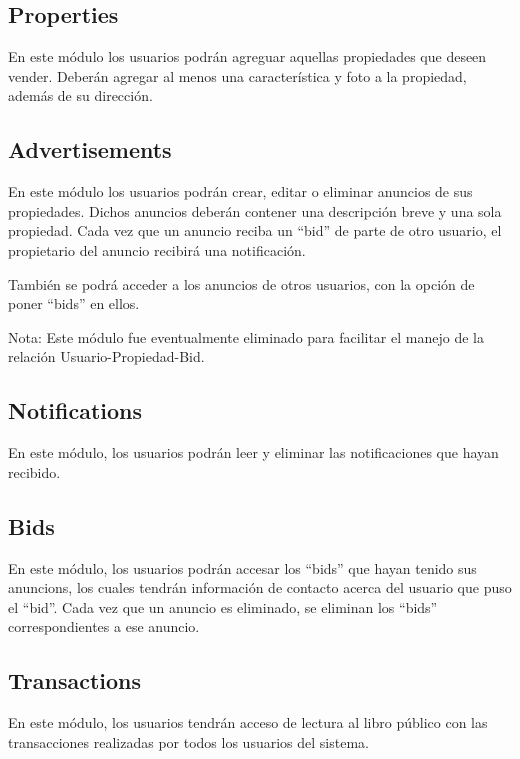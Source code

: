 \documentclass{article}
\begin{document}
\subsection{Properties}
En este m\'odulo los usuarios podr\'an agreguar aquellas propiedades que deseen vender. Deber\'an agregar al menos una caracter\'istica y foto a la propiedad, adem\'as de su direcci\'on.

\subsection{Advertisements}
En este m\'odulo los usuarios podr\'an crear, editar o eliminar anuncios de sus propiedades. Dichos anuncios deber\'an contener una descripci\'on breve y una sola propiedad. Cada vez que un anuncio reciba un ``bid'' de parte de otro usuario, el propietario del anuncio recibir\'a una notificaci\'on.

Tambi\'en se podr\'a acceder a los anuncios de otros usuarios, con la opci\'on de poner ``bids'' en ellos.

Nota: Este m\'odulo fue eventualmente eliminado para facilitar el manejo de la relaci\'on Usuario-Propiedad-Bid.

\subsection{Notifications}
En este m\'odulo, los usuarios podr\'an leer y eliminar las notificaciones que hayan recibido.

\subsection{Bids}
En este m\'odulo, los usuarios podr\'an accesar los ``bids'' que hayan tenido sus anuncions, los cuales tendr\'an informaci\'on de contacto acerca del usuario que puso el ``bid''. Cada vez que un anuncio es eliminado, se eliminan los ``bids'' correspondientes a ese anuncio.

\subsection{Transactions}
En este m\'odulo, los usuarios tendr\'an acceso de lectura al libro p\'ublico con las transacciones realizadas por todos los usuarios del sistema.
\end{document}
